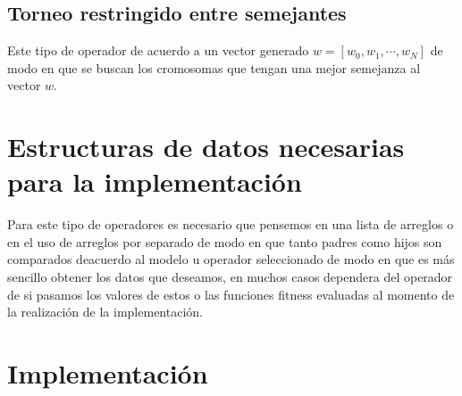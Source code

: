 \documentclass[10pt]{article}
\begin{document}
\subsection{Torneo restringido entre semejantes}
Este tipo de operador de acuerdo a un vector generado $w=[w_{0},w_{1},\cdots,w_{N}]$ de modo en que se buscan los cromosomas que tengan una mejor semejanza al vector $w$.
\section{Estructuras de datos necesarias para la implementación}
Para este tipo de operadores es necesario que pensemos en una lista de arreglos o en el uso de arreglos por separado de modo en que tanto padres como hijos son comparados deacuerdo al modelo u operador seleccionado de modo en que es más sencillo obtener los datos que deseamos, en muchos casos dependera del operador de si pasamos los valores de estos o las funciones fitness evaluadas al momento de la realización de la implementación.
\section{Implementación}

\end{document}
